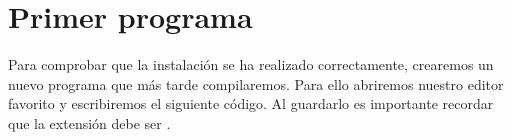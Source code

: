 \section{Primer programa}
Para comprobar que la instalación se ha realizado correctamente, crearemos un
nuevo programa que más tarde compilaremos. Para ello abriremos nuestro editor favorito
y escribiremos el siguiente código. Al guardarlo es importante recordar que la extensión
debe ser .
